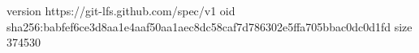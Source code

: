 version https://git-lfs.github.com/spec/v1
oid sha256:babfef6ce3d8aa1e4aaf50aa1aec8dc58caf7d786302e5ffa705bbac0dc0d1fd
size 374530
